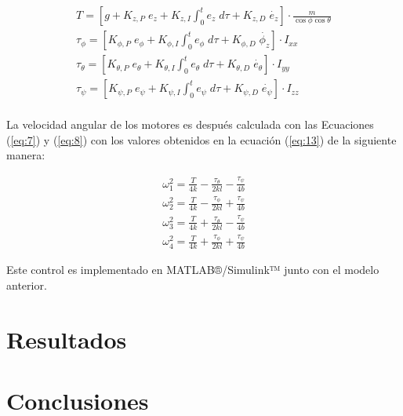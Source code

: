 \documentclass[11pt]{exam}
\begin{document}
        \begin{equation}
            \begin{gathered}
                T = \left[g + K_{z,P}\;e_z + K_{z,I}\int_0^t{e_z\;d\tau} + K_{z,D}\;\dot{e_z}\right]\cdot\frac{m}{\cos{\phi}\cos{\theta}} 
                \\
                \tau_{\phi} = \left[K_{\phi,P}\;e_\phi + K_{\phi,I}\int_0^t{e_\phi\;d\tau} + K_{\phi,D}\;\dot{\phi_z}\right]\cdot I_{xx} 
                \\
                \tau_{\theta} = \left[K_{\theta,P}\;e_\theta + K_{\theta,I}\int_0^t{e_\theta\;d\tau} + K_{\theta,D}\;\dot{e_\theta}\right]\cdot I_{yy} 
                \\
                \tau_{\psi} = \left[K_{\psi,P}\;e_\psi + K_{\psi,I}\int_0^t{e_\psi\;d\tau} + K_{\psi,D}\;\dot{e_\psi}\right]\cdot I_{zz} \\
            \end{gathered}
            \label{eq:13}
        \end{equation}

        La velocidad angular de los motores es despu\'es calculada con las Ecuaciones (\ref{eq:7}) y (\ref{eq:8}) con los valores obtenidos en la ecuaci\'on (\ref{eq:13}) de la siguiente manera:

        \begin{equation}
            \begin{gathered}
                \omega_1^2 = \frac{T}{4k} - \frac{\tau_\theta}{2kl} - \frac{\tau_\psi}{4b}
                \\
                \omega_2^2 = \frac{T}{4k} - \frac{\tau_\phi}{2kl} + \frac{\tau_\psi}{4b}
                \\
                \omega_3^2 = \frac{T}{4k} + \frac{\tau_\theta}{2kl} - \frac{\tau_\psi}{4b}
                \\
                \omega_4^2 = \frac{T}{4k} + \frac{\tau_\phi}{2kl} + \frac{\tau_\psi}{4b}
            \end{gathered}
        \end{equation}

        Este control es implementado en MATLAB®/Simulink™ junto con el modelo anterior.

    \section{Resultados}\label{sec4}

    \section{Conclusiones}\label{sec5}

    \printbibliography
\end{document}
